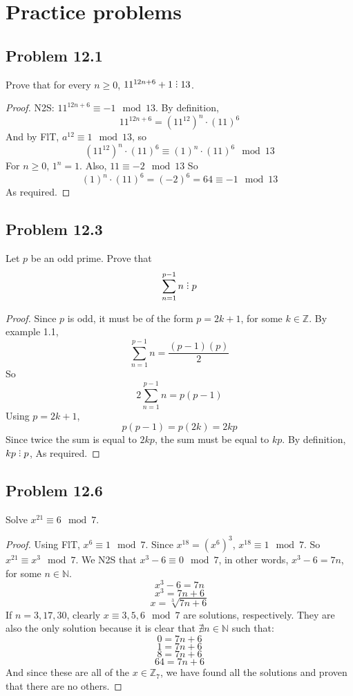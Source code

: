 \documentclass[12pt]{article}
\title{\scalebox{2}{Math 341 Homework 12}}
\author{\scalebox{1.5}{Theo Koss}}
\date{December 2020}
\newcommand{\N}{\mathbb{N}}
\newcommand{\Z}{\mathbb{Z}}
\newcommand{\divby}{%
  \mathrel{\text{\vbox{\baselineskip.65ex\lineskiplimit0pt\hbox{.}\hbox{.}\hbox{.}}}}%
  }
\begin{document}
\maketitle
\section{Practice problems}
\subsection{Problem 12.1}
Prove that for every $n\geq0$, $11^{12n+6}+1\divby13$.
\begin{proof}
N2S: $11^{12n+6}\equiv-1\mod{13}$. By definition, $$11^{12n+6}=(11^{12})^n\cdot(11)^6$$ And by FlT, $a^{12}\equiv1\mod{13}$, so $$(11^{12})^n\cdot(11)^6\equiv(1)^n\cdot(11)^6\mod{13}$$ For $n\geq0$, $1^n=1$. Also, $11\equiv-2\mod{13}$ So $$(1)^n\cdot(11)^6=(-2)^6=64\equiv-1\mod{13}$$ As required.
\end{proof}
\subsection{Problem 12.3}
Let $p$ be an odd prime. Prove that $$\sum_{n=1}^{p-1}n\divby p$$
\begin{proof}
Since $p$ is odd, it must be of the form $p=2k+1$, for some $k\in\Z$. By example 1.1, $$\sum_{n=1}^{p-1}n=\frac{(p-1)(p)}{2}$$ So $$2\sum_{n=1}^{p-1}n=p(p-1)$$ Using $p=2k+1$, $$p(p-1)=p(2k)=2kp$$ Since twice the sum is equal to $2kp$, the sum must be equal to $kp$. By definition, $kp\divby p$, As required.
\end{proof}
\subsection{Problem 12.6}
Solve $x^{21}\equiv6\mod{7}$.
\begin{proof} Using FlT, $x^{6}\equiv1\mod{7}$. Since $x^{18}=(x^{6})^3$, $x^{18}\equiv1\mod{7}$. So $x^{21}\equiv x^3\mod{7}$. \newline We N2S that $x^3-6\equiv0\mod{7}$, in other words, $x^3-6=7n$, for some $n\in\N$. $$x^3-6=7n$$ $$x^3=7n+6$$ $$x=\sqrt[3]{7n+6}$$ If $n=3,17,30$, clearly $x\equiv3,5,6\mod{7}$ are solutions, respectively. They are also the only solution because it is clear that $\nexists n\in\N$ such that: 
$$0=7n+6$$ $$1=7n+6$$ $$8=7n+6$$ $$64=7n+6$$
And since these are all of the $x\in\Z_{7}$, we have found all the solutions and proven that there are no others.\end{proof}
\end{document}
